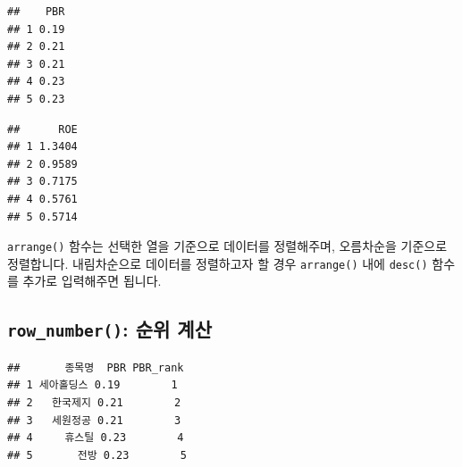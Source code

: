 \documentclass[12pt,]{book}
\newenvironment{Shaded}{\begin{snugshade}}{\end{snugshade}}
\newcommand{\DataTypeTok}[1]{\textcolor[rgb]{0.13,0.29,0.53}{#1}}
\newcommand{\DecValTok}[1]{\textcolor[rgb]{0.00,0.00,0.81}{#1}}
\newcommand{\KeywordTok}[1]{\textcolor[rgb]{0.13,0.29,0.53}{\textbf{#1}}}
\newcommand{\NormalTok}[1]{#1}
\newcommand{\OperatorTok}[1]{\textcolor[rgb]{0.81,0.36,0.00}{\textbf{#1}}}
\newcommand{\StringTok}[1]{\textcolor[rgb]{0.31,0.60,0.02}{#1}}
\begin{document}
\begin{verbatim}
##    PBR
## 1 0.19
## 2 0.21
## 3 0.21
## 4 0.23
## 5 0.23
\end{verbatim}

\begin{Shaded}
\end{Shaded}

\begin{verbatim}
##      ROE
## 1 1.3404
## 2 0.9589
## 3 0.7175
## 4 0.5761
## 5 0.5714
\end{verbatim}

\texttt{arrange()} 함수는 선택한 열을 기준으로 데이터를 정렬해주며, 오름차순을 기준으로 정렬합니다. 내림차순으로 데이터를 정렬하고자 할 경우 \texttt{arrange()} 내에 \texttt{desc()} 함수를 추가로 입력해주면 됩니다.

\hypertarget{row_number--}{%
\subsection{\texorpdfstring{\texttt{row\_number()}: 순위 계산}{row\_number(): 순위 계산}}\label{row_number--}}

\begin{Shaded}
\end{Shaded}

\begin{verbatim}
##       종목명  PBR PBR_rank
## 1 세아홀딩스 0.19        1
## 2   한국제지 0.21        2
## 3   세원정공 0.21        3
## 4     휴스틸 0.23        4
## 5       전방 0.23        5
\end{verbatim}
\end{document}
